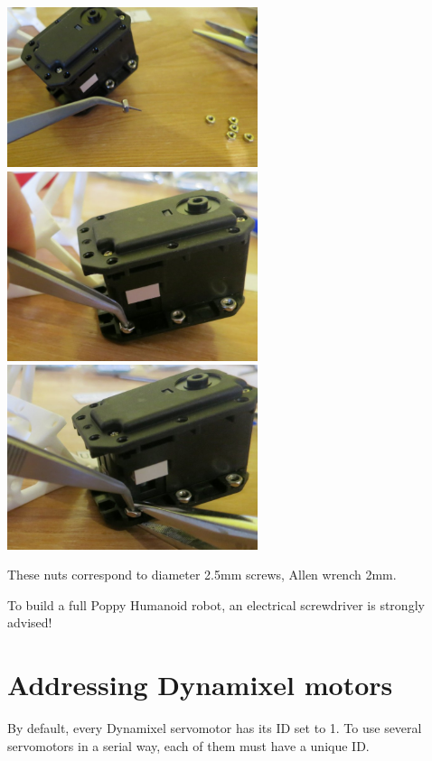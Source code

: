 \documentclass[includefoot]{article}
\begin{document}
 \begin{center}
  \includegraphics[width=0.55\textwidth]{img/nuts1}
  \includegraphics[width=0.55\textwidth]{img/nuts2}
  \includegraphics[width=0.55\textwidth]{img/nuts3}
 \end{center}
 
 These nuts correspond to diameter 2.5mm screws, Allen wrench 2mm.
 
 To build a full Poppy Humanoid robot, an electrical screwdriver is strongly advised!




\section{Addressing Dynamixel motors}
\label{addressing-poppys-motors}

By default, every Dynamixel servomotor has its ID set to 1. To use several servomotors in a serial way, each of them must have a unique ID.
\end{document}
